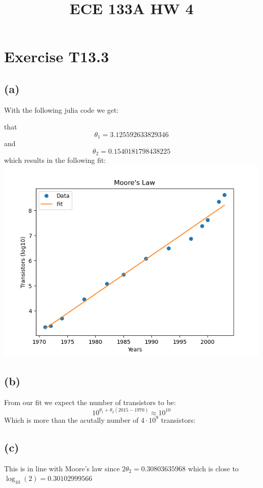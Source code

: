 
\title{ECE 133A HW 4}

\maketitle
\section*{Exercise T13.3}
\subsection*{(a)}
With the following julia code we get:

that 
$$\theta_1=3.125592633829346$$
and 
$$\theta_2=0.1540181798438225$$
which results in the following fit:\\
\includegraphics[scale=0.5]{"Moore's Law.png"}
\subsection*{(b)}
From our fit we expect the number of transistors to be:
$$10^{\theta_1+\theta_2(2015-1970)}\approx 10^{10}$$
Which is more than the acutally number of $4\cdot 10^9$ transistors:
\subsection*{(c)}
This is in line with Moore's law since
$2\theta_2=0.30803635968$ which is close to $\log_{10}(2)=0.30102999566$

